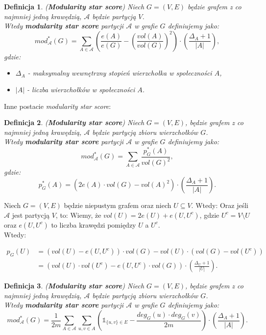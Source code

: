 \documentclass[letterpaper,12pt]{article}
\newtheorem{definition}{Definicja}
\begin{document}
  \begin{definition}
    (\textbf{Modularity star score}) Niech \(G = (V, E)\) będzie grafem z co najmniej jedną krawędzią, \(\mathcal{A}\) będzie partycją \(V\).\\
    Wtedy \textbf{modularity star score} partycji \(\mathcal{A}\) w grafie \(G\) definiujemy jako:
    \[
    mod^*_{\mathcal{A}}(G) = \sum_{A \in \mathcal{A}} \left(\frac{e(A)}{e(G)} - {\left(\frac{vol(A)}{vol(G)}\right)}^2\right) \cdot \left(\frac{\Delta_A + 1}{|A|}\right),
    \]
    gdzie:
    \begin{itemize}
      \item[-] \(\Delta_A\) - maksymalny wewnętrzny stopień wierzchołka w społeczności \(A\),
      \item[-] \(|A|\) - liczba wierzchołków w społeczności \(A\).\\
    \end{itemize}
  \end{definition}

  Inne postacie \textit{modularity star score}:
  \begin{definition}
    (\textbf{Modularity star score}) Niech \(G = (V, E)\), będzie grafem z co najmniej jedną krawędzią, \(\mathcal{A}\) będzie partycją zbioru wierzchołków \(G\).\\
    Wtedy \textbf{modularity star score} partycji \(\mathcal{A}\) w grafie \(G\) definiujemy jako:
    \[mod_{\mathcal{A}}^*(G) = \sum_{A \in \mathcal{A}} \frac{p_G^*(A)}{vol(G)^2},\]
    gdzie:
    \[p_G^*(A) = \left(2e(A) \cdot vol(G) - {vol(A)}^2\right) \cdot \left(\frac{\Delta_A + 1}{|A|}\right).\]
  \end{definition}
      Niech \(G = \left(V, E\right)\) będzie niepustym grafem oraz niech \(U \subseteq V\). Wtedy:
    Oraz jeśli \(\mathcal{A}\) jest partycją \(V\), to:
    Wiemy, że \(vol(U) = 2e(U) + e(U, U^c)\), gdzie \(U^c = V \setminus U\) oraz \(e(U, U^c)\) to liczba krawędzi pomiędzy \(U\) a \(U^c\).\\
    Wtedy:


    \begin{align*}
      p_G(U) &= \left(vol(U) - e(U, U^c)\right) \cdot vol(G) - vol(U) \cdot \left(vol(G)-vol(U^c)\right) \\
      &= \left(vol(U) \cdot vol(U^c) - e(U, U^c) \cdot vol(G)\right) \cdot \left(\frac{\Delta_U + 1}{|U|}\right).
    \end{align*}

  \begin{definition}
    (\textbf{Modularity star score}) Niech \(G = (V, E)\), będzie grafem z co najmniej jedną krawędzią, \(\mathcal{A}\) będzie partycją zbioru wierzchołków \(G\).\\
    Wtedy \textbf{modularity star score} partycji \(\mathcal{A}\) w grafie \(G\) definiujemy jako:
    \[mod_{\mathcal{A}}^*(G) = \frac{1}{2m}\sum_{A \in \mathcal{A}} \sum_{u,v \in A} \left( \mathbb{1}_{\{u,v\} \in E} - \frac{deg_G(u) \cdot deg_G(v)}{2m}\right) \cdot \left(\frac{\Delta_A + 1}{|A|}\right).\]
  \end{definition}
\end{document}
